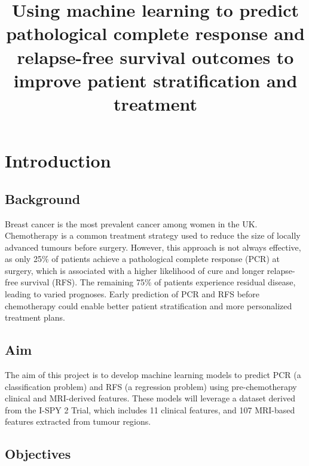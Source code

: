 \documentclass{article}
\title{
  Using machine learning to predict pathological complete response and relapse-free survival outcomes to improve patient stratification and treatment}
\begin{document}
%
\maketitle
%
\begin{abstract}

\end{abstract}
%
\begin{keywords}

\end{keywords}
%
\section{Introduction}
\subsection{Background}
Breast cancer is the most prevalent cancer among women in the UK. Chemotherapy is a common treatment strategy used to reduce the size of locally advanced tumours before surgery. However, this approach is not always effective, as only 25\% of patients achieve a pathological complete response (PCR) at surgery, which is  associated with a higher likelihood of cure and longer relapse-free survival (RFS). The remaining 75\% of patients experience residual disease, leading to varied prognoses. Early prediction of PCR and RFS before chemotherapy could enable better patient stratification and more personalized treatment plans.

\subsection{Aim}
The aim of this project is to develop machine learning models to predict PCR (a classification problem) and RFS (a regression problem) using pre-chemotherapy clinical and MRI-derived features. These models will leverage a dataset derived from the I-SPY 2 Trial, which includes 11 clinical features, and 107 MRI-based features extracted from tumour regions.

\subsection{Objectives}
\end{document}
